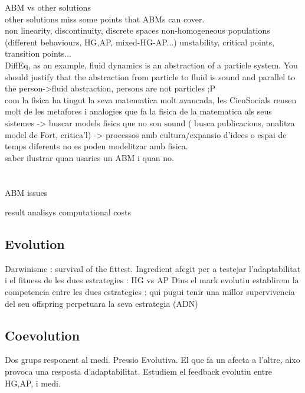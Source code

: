 \documentclass{report}
\begin{document}
		ABM vs other solutions
\\      
		    other solutions miss some points that ABMs can cover.
\\
		      non linearity, discontinuity, discrete spaces
		      non-homogeneous populations (different behaviours, HG,AP, mixed-HG-AP...)
		      unstability, critical points, transition points...
\\
		      DiffEq, as an example, fluid dynamics is an abstraction of a particle system.
		      You should justify that the abstraction from particle to fluid is sound and
		      parallel to the person->fluid abstraction, persons are not particles ;P
\\
		      com la fisica ha tingut la seva matematica molt avancada, les CienSocials
		      reusen molt de les metafores i analogies que fa la fi­sica de la matematica
		      als seus sistemes -> buscar models fi­sics que no son sound ( busca publicacions,
		      analitza model de Fort, critica'l) -> processos amb cultura/expansio d'idees o espai de temps
		      diferents no es poden modelitzar amb fi­sica. 
\\
		    saber ilustrar quan usaries un ABM i quan no.
\\
\\
\\
		ABM issues
  
		    result analisys
		    computational costs


		\subsection{Evolution}
		Darwinisme : survival of the fittest.
		Ingredient afegit per a testejar l'adaptabilitat i el fitness de les dues estrategies : HG vs AP
		Dins el mark evolutiu establirem la competencia entre les dues estrategies : qui pugui tenir una
		millor supervivencia del seu offspring perpetuara  la seva estrategia (ADN)
		
		\subsection{Coevolution}
		Dos grups responent al medi. Pressio Evolutiva. El que fa un afecta a l'altre, aixo provoca una
		resposta d'adaptabilitat. Estudiem el feedback evolutiu entre HG,AP, i medi.

	
\end{document}
